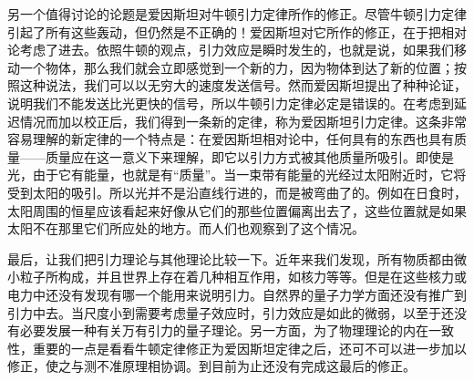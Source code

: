 另一个值得讨论的论题是爱因斯坦对牛顿引力定律所作的修正。尽管牛顿引力定律引起了所有这些轰动，但仍然是不正确的！爱因斯坦对它所作的修正，在于把相对论考虑了进去。依照牛顿的观点，引力效应是瞬时发生的，也就是说，如果我们移动一个物体，那么我们就会立即感觉到一个新的力，因为物体到达了新的位置；按照这种说法，我们可以以无穷大的速度发送信号。然而爱因斯坦提出了种种论证，说明我们不能发送比光更快的信号，所以牛顿引力定律必定是错误的。在考虑到延迟情况而加以校正后，我们得到一条新的定律，称为爱因斯坦引力定律。这条非常容易理解的新定律的一个特点是：在爱因斯坦相对论中，任何具有的东西也具有质量——质量应在这一意义下来理解，即它以引力方式被其他质量所吸引。即使是光，由于它有能量，也就是有“质量”。当一束带有能量的光经过太阳附近时，它将受到太阳的吸引。所以光并不是沿直线行进的，而是被弯曲了的。例如在日食时，太阳周围的恒星应该看起来好像从它们的那些位置偏离出去了，这些位置就是如果太阳不在那里它们所应处的地方。而人们也观察到了这个情况。

最后，让我们把引力理论与其他理论比较一下。近年来我们发现，所有物质都由微小粒子所构成，并且世界上存在着几种相互作用，如核力等等。但是在这些核力或电力中还没有发现有哪一个能用来说明引力。自然界的量子力学方面还没有推广到引力中去。当尺度小到需要考虑量子效应时，引力效应是如此的微弱，以至于还没有必要发展一种有关万有引力的量子理论。另一方面，为了物理理论的内在一致性，重要的一点是看看牛顿定律修正为爱因斯坦定律之后，还可不可以进一步加以修正，使之与测不准原理相协调。到目前为止还没有完成这最后的修正。
